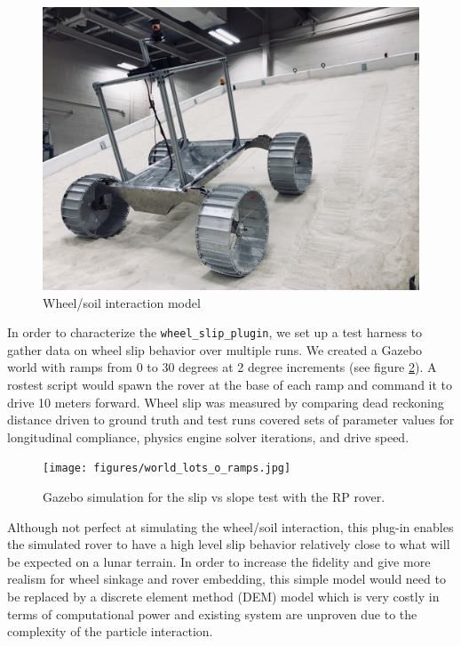 \documentclass[twocolumn,letterpaper]{IEEEAerospaceCLS}  %
\begin{document}
\begin{figure}[h!]
	\includegraphics[width=\columnwidth]{figures/wheel_slip_MGRU.JPG}
   	\caption{Wheel/soil interaction model}
    \label{fig:wheelsoilmodel}
\end{figure}
In order to characterize the \texttt{wheel\_slip\_plugin}, we set up a test harness to gather data on wheel slip behavior over multiple runs. We created a Gazebo world with ramps from 0 to 30 degrees at 2 degree increments (see figure \ref{fig:simulationramps}). A rostest script would spawn the rover at the base of each ramp and command it to drive 10 meters forward. Wheel slip was measured by comparing dead reckoning distance driven to ground truth and test runs covered sets of parameter values for longitudinal compliance, physics engine solver iterations, and drive speed. 
\begin{figure}[h!]
	\texttt{[image: figures/world\_lots\_o\_ramps.jpg]}
   	\caption{Gazebo simulation for the slip vs slope test with the RP rover.}
    \label{fig:simulationramps}
\end{figure}

Although not perfect at simulating the wheel/soil interaction, this plug-in enables the simulated rover to have a high level slip behavior relatively close to what will be expected on a lunar terrain. In order to increase the fidelity and give more realism for wheel sinkage and rover embedding, this simple model would need to be replaced by a discrete element method (DEM) model which is very costly in terms of computational power and existing system are unproven due to the complexity of the particle interaction.
\end{document}
